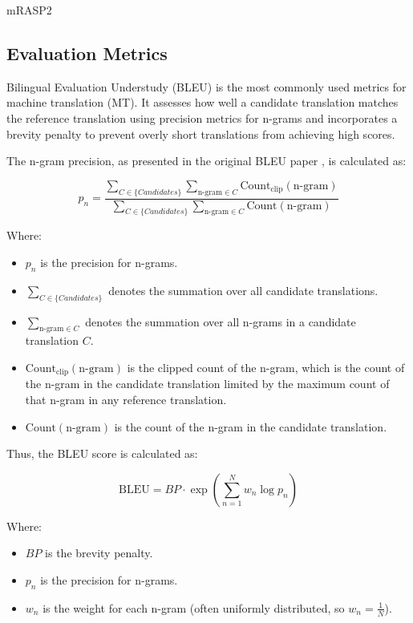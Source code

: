 \documentclass[a4paper]{article}
\begin{document}
mRASP2 \cite{pan-2021-mrasp2}

\subsection{Evaluation Metrics}

Bilingual Evaluation Understudy (BLEU) \cite{papieni-2002-bleu} is the most commonly used metrics for machine translation (MT). It assesses how well a candidate translation matches the reference translation using precision metrics for n-grams and incorporates a brevity penalty to prevent overly short translations from achieving high scores.

The n-gram precision, as presented in the original BLEU paper \cite{papieni-2002-bleu}, is calculated as:

\begin{equation}
    p_n = \frac{\sum_{C \in \{Candidates\}} \sum_{\text{n-gram} \in C} \text{Count}_{\text{clip}}(\text{n-gram})}{\sum_{C \in \{Candidates\}} \sum_{\text{n-gram} \in C} \text{Count}(\text{n-gram})}
\end{equation}

Where:
\begin{itemize}
    \item \( p_n \) is the precision for n-grams.
    \item \( \sum_{C \in \{Candidates\}} \) denotes the summation over all candidate translations.
    \item \( \sum_{\text{n-gram} \in C} \) denotes the summation over all n-grams in a candidate translation \( C \).
    \item \( \text{Count}_{\text{clip}}(\text{n-gram}) \) is the clipped count of the n-gram, which is the count of the n-gram in the candidate translation limited by the maximum count of that n-gram in any reference translation.
    \item \( \text{Count}(\text{n-gram}) \) is the count of the n-gram in the candidate translation.
\end{itemize}

Thus, the BLEU score is calculated as:

\begin{equation}
    \text{BLEU} = BP \cdot \exp \left( \sum_{n=1}^{N} w_n \log p_n \right)
\end{equation}

Where:
\begin{itemize}
    \item \( BP \) is the brevity penalty.
    \item \( p_n \) is the precision for n-grams.
    \item \( w_n \) is the weight for each n-gram (often uniformly distributed, so \( w_n = \frac{1}{N} \)).
\end{itemize}
\end{document}
